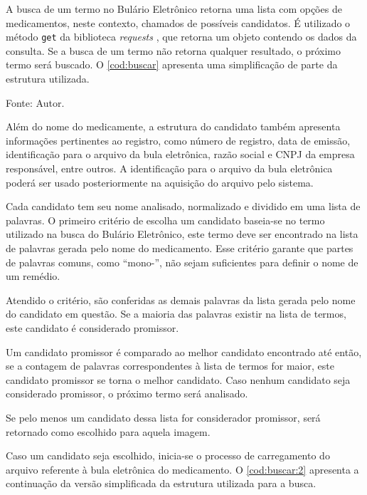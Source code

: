 A busca de um termo no Bulário Eletrônico retorna uma lista com opções de medicamentos, neste contexto, chamados de possíveis candidatos.
É utilizado o método \lstinline|get| da biblioteca \textit{requests} \cite{reitz2024request}, que retorna um objeto contendo os dados da consulta.
Se a busca de um termo não retorna qualquer resultado, o próximo termo será buscado.
O \autoref{cod:buscar} apresenta uma simplificação de parte da estrutura utilizada.

\begin{lstfloat}[htbp]
    \centering
    
    \caption*{Fonte: Autor.}
\end{lstfloat}

Além do nome do medicamente, a estrutura do candidato também apresenta informações pertinentes ao registro, como número de registro, data de emissão, identificação para o arquivo da bula eletrônica, razão social e \acs{CNPJ} da empresa responsável, entre outros.
A identificação para o arquivo da bula eletrônica poderá ser usado posteriormente na aquisição do arquivo pelo sistema.

Cada candidato tem seu nome analisado, normalizado e dividido em uma lista de palavras.
O primeiro critério de escolha um candidato baseia-se no termo utilizado na busca do Bulário Eletrônico, este termo deve ser encontrado na lista de palavras gerada pelo nome do medicamento.
Esse critério garante que partes de palavras comuns, como ``mono-'', não sejam suficientes para definir o nome de um remédio.

Atendido o critério, são conferidas as demais palavras da lista gerada pelo nome do candidato em questão.
Se a maioria das palavras existir na lista de termos, este candidato é considerado promissor.

Um candidato promissor é comparado ao melhor candidato encontrado até então, se a contagem de palavras correspondentes à lista de termos for maior, este candidato promissor se torna o melhor candidato.
Caso nenhum candidato seja considerado promissor, o próximo termo será analisado.

Se pelo menos um candidato dessa lista for considerador promissor, será retornado como escolhido para aquela imagem.

Caso um candidato seja escolhido, inicia-se o processo de carregamento do arquivo referente à bula eletrônica do medicamento.
O \autoref{cod:buscar:2} apresenta a continuação da versão simplificada da estrutura utilizada para a busca.

